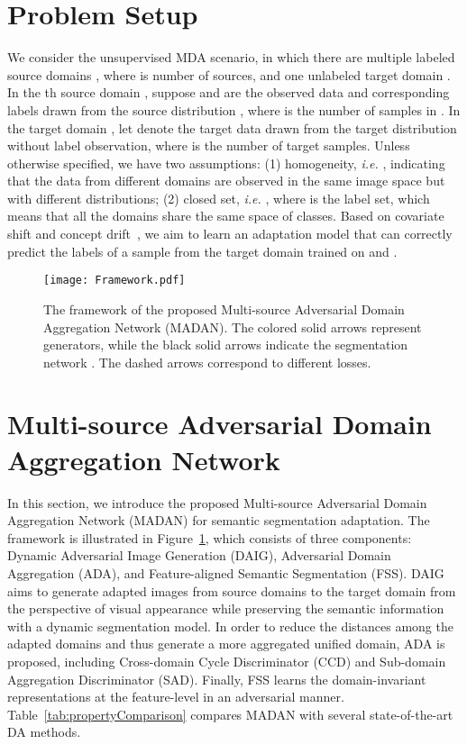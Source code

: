 \documentclass{article}
\begin{document}
\section{Problem Setup}

We consider the unsupervised MDA scenario, in which there are multiple labeled source domains , where  is number of sources, and one unlabeled target domain . In the th source domain , suppose  and  are the observed data and corresponding labels drawn from the source distribution , where  is the number of samples in . In the target domain , let  denote the target data drawn from the target distribution  without label observation, where  is the number of target samples.
Unless otherwise specified, we have two assumptions: (1) homogeneity, \textit{i.e.} , indicating that the data from different domains are observed in the same image space but with different distributions; (2) closed set, \textit{i.e.} , where  is the label set, which means that all the domains share the same space of classes. Based on covariate shift and concept drift~\cite{patel2015visual}, we aim to learn an adaptation model that can correctly predict the labels of a sample from the target domain trained on  and .










\begin{figure}
\centering
\texttt{[image: Framework.pdf]}
\caption{The framework of the proposed Multi-source Adversarial Domain Aggregation Network (MADAN). The colored solid arrows represent generators, while the black solid arrows indicate the segmentation network . The dashed arrows correspond to different losses.}
\label{fig:Framework}
\end{figure}




\section{Multi-source Adversarial Domain Aggregation Network}
In this section, we introduce the proposed Multi-source Adversarial Domain Aggregation Network (MADAN) for semantic segmentation adaptation. The framework is illustrated in Figure~\ref{fig:Framework}, which consists of three components: Dynamic Adversarial Image Generation (DAIG), Adversarial Domain Aggregation (ADA), and Feature-aligned Semantic Segmentation (FSS). DAIG aims to generate adapted images from source domains to the target domain from the perspective of visual appearance while preserving the semantic information with a dynamic segmentation model. In order to reduce the distances among the adapted domains and thus generate a more aggregated unified domain, ADA is proposed, including Cross-domain Cycle Discriminator (CCD) and Sub-domain Aggregation Discriminator (SAD). Finally, FSS learns the domain-invariant representations at the feature-level in an adversarial manner. Table~\ref{tab:propertyComparison} compares MADAN with several state-of-the-art DA methods.
\end{document}

